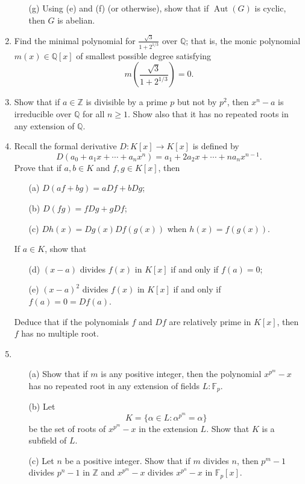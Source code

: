 \documentclass{article}
\begin{document}
\begin{enumerate}
\begin{enumerate}
    \item[(g)] Using (e) and (f) (or otherwise), show that if $\operatorname{Aut}(G)$ is cyclic, then $G$ is abelian.
\end{enumerate}

\item Find the minimal polynomial for $\displaystyle \frac{\sqrt{3}}{1 + 2^{1/3}}$ over $\mathbb{Q}$; that is, the monic polynomial $m(x) \in \mathbb{Q}[x]$ of smallest possible degree satisfying
\[
m\left( \frac{\sqrt{3}}{1 + 2^{1/3}} \right) = 0.
\]

\item Show that if $a \in \mathbb{Z}$ is divisible by a prime $p$ but not by $p^2$, then $x^n - a$ is irreducible over $\mathbb{Q}$ for all $n \geq 1$. Show also that it has no repeated roots in any extension of $\mathbb{Q}$.

\item Recall the formal derivative $D: K[x] \to K[x]$ is defined by
\[
D\left( a_0 + a_1 x + \cdots + a_n x^n \right) = a_1 + 2a_2 x + \cdots + n a_n x^{n-1}.
\]
Prove that if $a, b \in K$ and $f, g \in K[x]$, then
\begin{enumerate}
    \item[(a)] $D(af + bg) = aDf + bDg$;
    \item[(b)] $D(fg) = fDg + gDf$;
    \item[(c)] $Dh(x) = Dg(x)Df(g(x))$ when $h(x) = f(g(x))$.
\end{enumerate}
If $a \in K$, show that
\begin{enumerate}
    \item[(d)] $(x - a)$ divides $f(x)$ in $K[x]$ if and only if $f(a) = 0$;
    \item[(e)] $(x - a)^2$ divides $f(x)$ in $K[x]$ if and only if $f(a) = 0 = Df(a)$.
\end{enumerate}
Deduce that if the polynomials $f$ and $Df$ are relatively prime in $K[x]$, then $f$ has no multiple root.

\item 
\begin{enumerate}
    \item[(a)] Show that if $m$ is any positive integer, then the polynomial $x^{p^m} - x$ has no repeated root in any extension of fields $L : \mathbb{F}_p$. 
    \item[(b)] Let
\[
K = \{ \alpha \in L : \alpha^{p^m} = \alpha \}
\]
be the set of roots of $x^{p^m} - x$ in the extension $L$. Show that $K$ is a subfield of $L$.
\item[(c)] Let $n$ be a positive integer. Show that if $m$ divides $n$, then $p^m - 1$ divides $p^n - 1$ in $\mathbb{Z}$ and $x^{p^m} - x$ divides $x^{p^n} - x$ in $\mathbb{F}_p[x]$.
\end{enumerate}


\end{enumerate}
\end{document}
